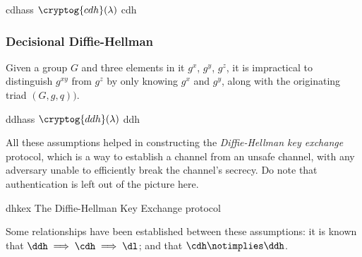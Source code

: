 \begin{cryptogame}
    {cdhass}
    {$\cryptog{cdh}(\lambda)$}
    {cdh}


    
\end{cryptogame}

\subsubsection{Decisional Diffie-Hellman}

Given a group $G$ and three elements in it $g^x$, $g^y$, $g^z$, it is impractical to distinguish $g^{xy}$ from $g^z$ by only knowing $g^x$ and $g^y$, along with the originating triad $(G, g, q))$.

\begin{cryptogame}
    {ddhass}
    {$\cryptog{ddh}(\lambda)$}
    {ddh}

    \cseqdelay


    \cseqdelay

    
\end{cryptogame}

All these assumptions helped in constructing the \emph{Diffie-Hellman key exchange} protocol, which is a way to establish a \ske{} channel from an unsafe channel, with any adversary unable to efficiently break the channel's secrecy. Do note that authentication is left out of the picture here.

\begin{cryptosequence}
    {dhkex}
    {The Diffie-Hellman Key Exchange protocol}
    


    \cseqdelay


\end{cryptosequence}

Some relationships have been established between these assumptions: it is known that $\ddh \implies \cdh \implies \dl$; and that $\cdh \notimplies \ddh$.
